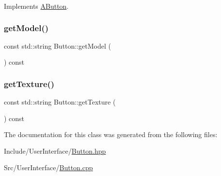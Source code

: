Implements \mbox{\hyperlink{class_a_button_a6ceaa1f1062009f1206fad570d07afbc}{A\+Button}}.

\mbox{\label{class_button_a96fb1c0a5d811e135f473d25634149a1}} 
\subsubsection{\texorpdfstring{getModel()}{getModel()}}
{\footnotesize\ttfamily const std\+::string Button\+::get\+Model (\begin{DoxyParamCaption}{ }\end{DoxyParamCaption}) const}

\mbox{\label{class_button_a2456061acae03623de618323f0be722b}} 
\subsubsection{\texorpdfstring{getTexture()}{getTexture()}}
{\footnotesize\ttfamily const std\+::string Button\+::get\+Texture (\begin{DoxyParamCaption}{ }\end{DoxyParamCaption}) const}



The documentation for this class was generated from the following files\+:\begin{DoxyCompactItemize}
\item 
Include/\+User\+Interface/\mbox{\hyperlink{_button_8hpp}{Button.\+hpp}}\item 
Src/\+User\+Interface/\mbox{\hyperlink{_button_8cpp}{Button.\+cpp}}\end{DoxyCompactItemize}
